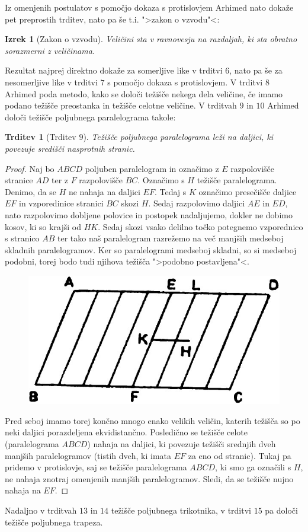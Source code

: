 \documentclass[a4paper, 10pt]{article}
\newtheorem*{izr*}{Izrek}
\newtheorem*{trd*}{Trditev}
\begin{document}
		Iz omenjenih postulatov s pomočjo dokaza s protislovjem Arhimed nato dokaže pet preprostih trditev, nato pa še t.i. ">zakon o vzvodu"<:\begin{izr*}[Zakon o vzvodu]
			Veličini sta v ravnovesju na razdaljah, ki sta obratno sorazmerni z veličinama.
		\end{izr*} 
		Rezultat najprej direktno dokaže za somerljive like v trditvi $6$, nato pa še za nesomerljive like v trditvi $7$ s pomočjo dokaza s protislovjem. V trditvi $8$ Arhimed poda metodo, kako se določi težišče nekega dela veličine, če imamo podano težišče preostanka in težišče celotne veličine. V trditvah $9$ in $10$ Arhimed določi težišče poljubnega paralelograma takole: 
		\begin{trd*}[Trditev $9$]
			Težišče poljubnega paralelograma leži na daljici, ki povezuje središči nasprotnih stranic.
		\end{trd*}
		\begin{proof}
			Naj bo $ABCD$ poljuben paralelogram in označimo z $E$ razpolovišče stranice $AD$ ter z $F$ razpolovišče $BC$. Označimo s $H$ težišče paralelograma. Denimo, da se $H$ ne nahaja na daljici $EF$. Tedaj s $K$ označimo presečišče daljice $EF$ in vzporedinice stranici $BC$ skozi $H$. Sedaj razpolovimo daljici $AE$ in $ED$, nato razpolovimo dobljene polovice in postopek nadaljujemo, dokler ne dobimo kosov, ki so krajši od $HK$. Sedaj skozi vsako delilno točko potegnemo vzporednico s stranico $AB$ ter tako naš paralelogram razrežemo na več manjših medseboj skladnih paralelogramov. Ker so paralelogrami medseboj skladni, so si medseboj podobni, torej bodo tudi njihova težišča ">podobno postavljena"<. 
			\begin{figure}[h!]
				\centering
				\includegraphics[scale=0.5]{Paralelogram.jpg}
			\end{figure}
			
			Pred seboj imamo torej končno mnogo enako velikih veličin, katerih težišča so po neki daljici porazdeljena ekvidistančno. Posledično se težišče celote (paralelograma $ABCD$) nahaja na daljici, ki povezuje težišči srednjih dveh manjših paralelogramov (tistih dveh, ki imata $EF$ za eno od stranic). Tukaj pa pridemo v protislovje, saj se težišče paralelograma $ABCD$, ki smo ga označili s $H$, ne nahaja znotraj omenjenih manjših paralelogramov. Sledi, da se težišče nujno nahaja na $EF$.
		\end{proof}
		Nadaljno v trditvah $13$ in $14$ težišče poljubnega trikotnika, v trditvi $15$ pa določi težišče poljubnega trapeza. 
\end{document}
